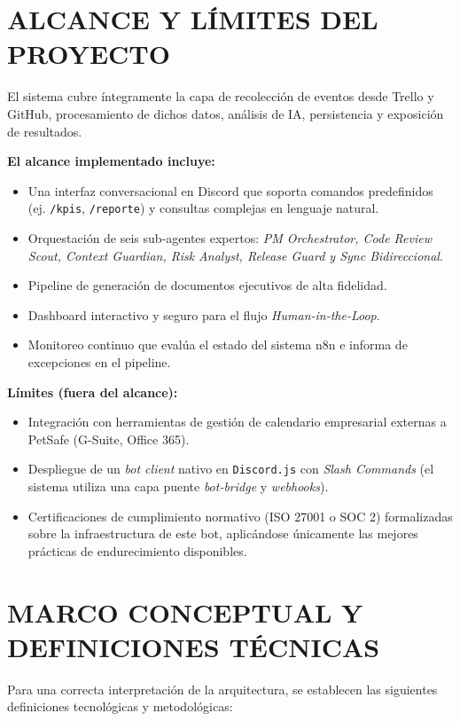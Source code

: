 \documentclass{encabezado}
\begin{document}
\section{ALCANCE Y LÍMITES DEL PROYECTO}

El sistema cubre íntegramente la capa de recolección de eventos desde Trello y GitHub, procesamiento de dichos datos, análisis de IA, persistencia y exposición de resultados. 

\textbf{El alcance implementado incluye:}
\begin{itemize}
    \item Una interfaz conversacional en Discord que soporta comandos predefinidos (ej. \texttt{/kpis}, \texttt{/reporte}) y consultas complejas en lenguaje natural.
    \item Orquestación de seis sub-agentes expertos: \textit{PM Orchestrator, Code Review Scout, Context Guardian, Risk Analyst, Release Guard y Sync Bidireccional}.
    \item Pipeline de generación de documentos ejecutivos de alta fidelidad.
    \item Dashboard interactivo y seguro para el flujo \textit{Human-in-the-Loop}.
    \item Monitoreo continuo que evalúa el estado del sistema n8n e informa de excepciones en el pipeline.
\end{itemize}

\textbf{Límites (fuera del alcance):}
\begin{itemize}
    \item Integración con herramientas de gestión de calendario empresarial externas a PetSafe (G-Suite, Office 365).
    \item Despliegue de un \textit{bot client} nativo en \texttt{Discord.js} con \textit{Slash Commands} (el sistema utiliza una capa puente \textit{bot-bridge} y \textit{webhooks}).
    \item Certificaciones de cumplimiento normativo (ISO 27001 o SOC 2) formalizadas sobre la infraestructura de este bot, aplicándose únicamente las mejores prácticas de endurecimiento disponibles.
\end{itemize}

\section{MARCO CONCEPTUAL Y DEFINICIONES TÉCNICAS}

Para una correcta interpretación de la arquitectura, se establecen las siguientes definiciones tecnológicas y metodológicas:
\end{document}
